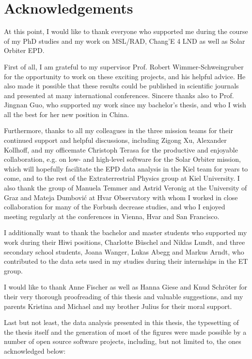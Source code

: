 \chapter*{Acknowledgements}




At this point, I would like to thank everyone who supported me during the course of my PhD studies and my work on MSL/RAD, Chang'E 4 LND as well as Solar Orbiter EPD.

First of all, I am grateful to my supervisor Prof. Robert Wimmer-Schweingruber for the opportunity to work on these exciting projects, and his helpful advice. He also made it possible that these results could be published in scientific journals and presented at many international conferences. Sincere thanks also to Prof. Jingnan Guo, who supported my work since my bachelor's thesis, and who I wish all the best for her new position in China.

Furthermore, thanks to all my colleagues in the three mission teams for their continued support and helpful discussions, including Zigong Xu, Alexander Kollhoff, and my officemate Christoph Terasa for the productive and enjoyable collaboration, e.g. on low- and high-level software for the Solar Orbiter mission, which will hopefully facilitate the EPD data analysis in the Kiel team for years to come, and to the rest of the Extraterrestrial Physics group at Kiel University. I also thank the group of Manuela Temmer and Astrid Veronig at the University of Graz and Mateja Dumbović at Hvar Observatory with whom I worked in close collaboration for many of the Forbush decrease studies, and who I enjoyed meeting regularly at the conferences in Vienna, Hvar and San Francisco.

I additionally want to thank the bachelor and master students who supported my work during their Hiwi positions, Charlotte Büschel and Niklas Lundt, and three secondary school students, Joana Wanger, Lukas Abegg and Markus Arndt, who contributed to the data sets used in my studies during their internships in the ET group.

I would like to thank Anne Fischer as well as Hanna Giese and Knud Schröter for their very thorough proofreading of this thesis and valuable suggestions, and my parents Kristina and Michael and my brother Julius for their moral support. 

Last but not least, the data analysis presented in this thesis, the typesetting of the thesis itself and the generation of most of the figures were made possible by a number of open source software projects, including, but not limited to, the ones acknowledged below:

\begin{refsection}
	\nocite{*}
	\newrefcontext[sorting=none]
	\printbibliography[heading=none]
\end{refsection}
